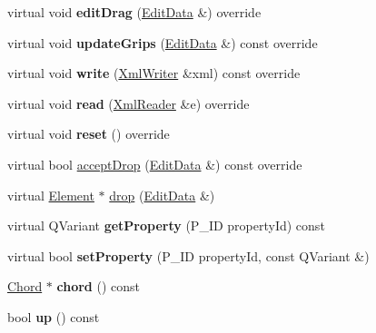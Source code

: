 \begin{DoxyCompactItemize}
virtual void {\bfseries edit\+Drag} (\hyperlink{class_ms_1_1_edit_data}{Edit\+Data} \&) override
\item 
\mbox{\label{class_ms_1_1_stem_aeeabe1391ee04fe4b1896f0337ea137b}} 
virtual void {\bfseries update\+Grips} (\hyperlink{class_ms_1_1_edit_data}{Edit\+Data} \&) const override
\item 
\mbox{\label{class_ms_1_1_stem_a81ddcc690c22a7a0255c1fd7188f02de}} 
virtual void {\bfseries write} (\hyperlink{class_ms_1_1_xml_writer}{Xml\+Writer} \&xml) const override
\item 
\mbox{\label{class_ms_1_1_stem_a92025e177b61830d49fd43fd7ccbe168}} 
virtual void {\bfseries read} (\hyperlink{class_ms_1_1_xml_reader}{Xml\+Reader} \&e) override
\item 
\mbox{\label{class_ms_1_1_stem_afe0008729e32aa340c751502c414333f}} 
virtual void {\bfseries reset} () override
\item 
virtual bool \hyperlink{class_ms_1_1_stem_ac3edf3dc5966fcded6e5fcc8f1fb13d6}{accept\+Drop} (\hyperlink{class_ms_1_1_edit_data}{Edit\+Data} \&) const override
\item 
virtual \hyperlink{class_ms_1_1_element}{Element} $\ast$ \hyperlink{class_ms_1_1_stem_adbefb546ff6099b87df6f750c20d8354}{drop} (\hyperlink{class_ms_1_1_edit_data}{Edit\+Data} \&)
\item 
\mbox{\label{class_ms_1_1_stem_a63b7dbd680ad89d22e014983010ec61d}} 
virtual Q\+Variant {\bfseries get\+Property} (P\+\_\+\+ID property\+Id) const
\item 
\mbox{\label{class_ms_1_1_stem_aeabfafea7dd4fb3f7e2b8e28812ced99}} 
virtual bool {\bfseries set\+Property} (P\+\_\+\+ID property\+Id, const Q\+Variant \&)
\item 
\mbox{\label{class_ms_1_1_stem_afaee428e06668eda2cd5fdc1611d6d5d}} 
\hyperlink{class_ms_1_1_chord}{Chord} $\ast$ {\bfseries chord} () const
\item 
\mbox{\label{class_ms_1_1_stem_a1c4c2978b1f186aa0e8cb24ba5c34576}} 
bool {\bfseries up} () const
\item 

\end{DoxyCompactItemize}
